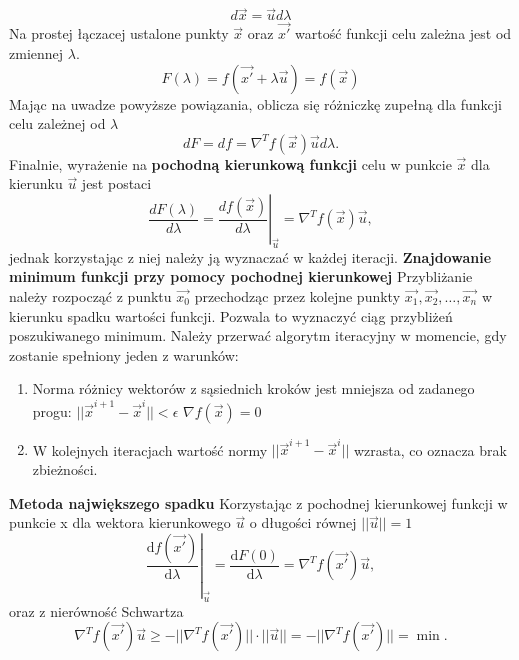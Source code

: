 \documentclass{article}
\begin{document}
\begin{equation}
d\vec{x} = \vec{u} d\lambda
\end{equation}
Na prostej łączacej ustalone punkty $\vec{x}$ oraz $\vec{x'}$ wartość funkcji celu zależna jest od zmiennej $\lambda$.
\begin{equation}
F(\lambda) = f(\vec{x'} + \lambda \vec{u} ) = f(\vec{x})
\end{equation}
Mając na uwadze powyższe powiązania, oblicza się różniczkę zupełną dla funkcji celu zależnej od $\lambda$
\begin{equation}
dF = df = \nabla^{T} f(\vec{x}) \vec{u} d \lambda.
\end{equation}
Finalnie, wyrażenie na \textbf{pochodną kierunkową funkcji} celu w punkcie $\vec{x}$ dla kierunku $\vec{u}$ jest postaci
\begin{equation}
\frac{d F (\lambda)}{d\lambda} = \left.\frac{df(\vec{x})}{d\lambda}\right|_{\vec{u}} = \nabla^{T} f(\vec{x}) \vec{u}, 
\label{wzor}
\end{equation}
jednak korzystając z niej należy ją wyznaczać w każdej iteracji.
\newline\newline
\textbf{Znajdowanie minimum funkcji przy pomocy pochodnej kierunkowej}
\newline
Przybliżanie należy rozpocząć z punktu $\vec{x_0}$ przechodząc przez kolejne punkty $\vec{x_1}, \vec{x_2}, \dots, \vec{x_n}$ w kierunku spadku wartości funkcji. Pozwala to wyznaczyć ciąg przybliżeń poszukiwanego minimum. Należy przerwać algorytm iteracyjny w momencie, gdy zostanie spełniony jeden z warunków:
\begin{enumerate}
	 \item Norma różnicy wektorów z sąsiednich kroków jest mniejsza od zadanego progu: $||\vec{x}^{i+1} - \vec{x}^i|| < \epsilon$
	 $\nabla f(\vec{x}) = 0$
	 \item W kolejnych iteracjach wartość normy $||\vec{x}^{i+1} - \vec{x}^i||$ wzrasta, co oznacza brak zbieżności.
\end{enumerate}
\textbf{Metoda największego spadku}
\newline
Korzystając z pochodnej kierunkowej funkcji w punkcie x dla wektora kierunkowego $\vec{u}$ o długości równej $||\vec{u}|| = 1$
	\begin{equation}
	\left.\frac{\text{d}f(\vec{x'})}{\text{d}\lambda}\right|_{\vec{u}} = \frac{\text{d}F(0)}{\text{d}\lambda} = 
	\nabla ^{T} f(\vec{x'})\vec{u},
	\end{equation}
oraz z nierówność Schwartza \begin{equation}
	\nabla^{T} f(\vec{x'}) \vec{u} \geq - ||\nabla^{T} f(\vec{x'})|| \cdot || \vec{u}  || = 
	- || \nabla ^{T} f(\vec{x'})|| = \min.
	\end{equation}
\end{document}
